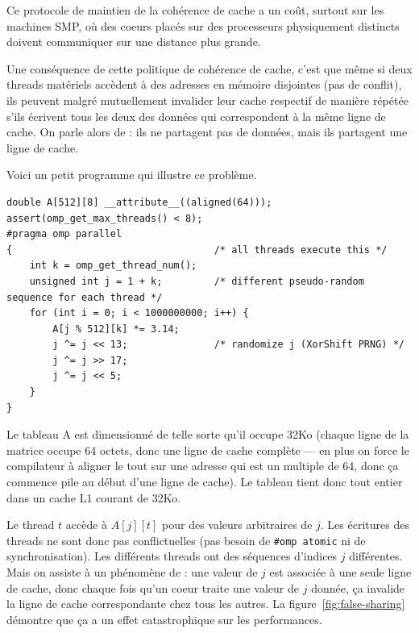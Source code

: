 Ce protocole de maintien de la cohérence de cache a un coût, surtout sur les
machines SMP, où des coeurs placés sur des processeurs physiquement distincts
doivent communiquer sur une distance plus grande.

Une conséquence de cette politique de cohérence de cache, c'est que même si deux
threads matériels accèdent à des adresses en mémoire disjointes (pas de
conflit), ils peuvent malgré mutuellement invalider leur cache respectif de
manière répétée s'ils écrivent tous les deux des données qui correspondent à la
même ligne de cache. On parle alors de \og {}\fg : ils ne
partagent pas de données, mais ils partagent une ligne de cache.

Voici un petit programme qui illustre ce problème. 

\begin{verbatim}
double A[512][8] __attribute__((aligned(64)));
assert(omp_get_max_threads() < 8);
#pragma omp parallel
{                                   /* all threads execute this */
    int k = omp_get_thread_num();
    unsigned int j = 1 + k;         /* different pseudo-random sequence for each thread */
    for (int i = 0; i < 1000000000; i++) {
        A[j % 512][k] *= 3.14; 
        j ^= j << 13;               /* randomize j (XorShift PRNG) */
        j ^= j >> 17;
        j ^= j << 5;
    }
}
\end{verbatim}

Le tableau A est dimensionné de telle sorte qu'il occupe 32Ko (chaque ligne de
la matrice occupe 64 octets, donc une ligne de cache complète --- en plus on
force le compilateur à aligner le tout sur une adresse qui est un multiple de
64, donc ça commence pile au début d'une ligne de cache). Le tableau tient donc
tout entier dans un cache L1 courant de 32Ko.

Le thread $t$ accède à $A[j][t]$ pour des valeurs arbitraires de $j$. Les
écritures des threads ne sont donc pas conflictuelles (pas besoin de
\texttt{\#omp atomic} ni de synchronisation). Les différents threads ont des
séquences d'indices $j$ différentes. Mais on assiste à un phénomène de
 : une valeur de $j$ est associée à une seule ligne de
cache, donc chaque fois qu'un coeur traite une valeur de $j$ donnée, ça invalide
la ligne de cache correspondante chez tous les autres. La
figure~\ref{fig:false-sharing} démontre que ça a un effet catastrophique sur les
performances.

